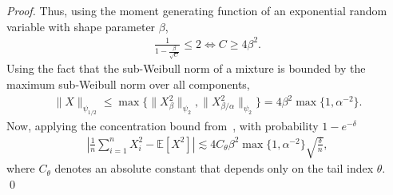 \documentclass[runningheads]{llncs}
\newcommand{\E}{\mathbb{E}}
\begin{document}
\begin{subappendices}
\begin{proof}
  Thus, using the moment generating function of an exponential random
  variable with shape parameter $\beta$,
  \begin{align*}
    \frac{1}{1-\frac{\beta}{\sqrt{C}}}\leq 2
    \iff
    C \geq 4\beta^2.
  \end{align*}
  Using the fact that the sub-Weibull norm of a mixture is bounded by
  the maximum sub-Weibull norm over all components,
  \begin{align*}
    \|X\|_{\psi_{1/2}}
    \leq
    \max\{\|X_{\beta}^2\|_{\psi_{2}}, \|X_{\beta/\alpha}^2\|_{\psi_{2}}\}
    = 4 \beta^{2}\max\{1, \alpha^{-2}\}.
  \end{align*}
  Now, applying the concentration bound from~\cite[Proposition
  3]{zhang2022sharper}, with probability $1- e^{-\delta}$
  \begin{align*}
    \left| \frac{1}{n} \sum_{i=1}^n X_i^2 - \E[X^2]\right|
    \lesssim
    4 C_\theta \beta^{2}\max\{1, \alpha^{-2}\} \sqrt{\frac{\delta}{n}},
  \end{align*}
  where $C_{\theta}$ denotes an absolute constant that depends only on the tail
  index $\theta$.
  \qed
\end{proof}

\end{subappendices}
\end{document}
